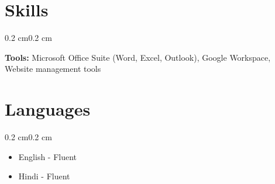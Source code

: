 \documentclass[10pt, letterpaper]{article}
\newenvironment{highlights}{%
    \begin{itemize}[
        topsep=0.10 cm,%
        parsep=0.10 cm,%
        partopsep=0pt,%
        itemsep=0pt,%
        leftmargin=0.4 cm + 10pt%
    ]
}{%
    \end{itemize}%
}
\newenvironment{onecolentry}{%
    \begin{adjustwidth}{0.2 cm}{0.2 cm}%
}{%
    \end{adjustwidth}%
}
\begin{document}
\section{Skills}
\begin{onecolentry}
    \textbf{Tools:} Microsoft Office Suite (Word, Excel, Outlook), Google Workspace, Website management tools\\
\end{onecolentry}


\section{Languages}
\begin{onecolentry}
    \begin{highlights}
        \item English - Fluent
        \item Hindi - Fluent
    \end{highlights}
\end{onecolentry}
\end{document}
